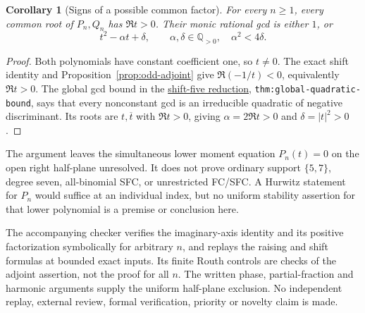 \documentclass[11pt]{article}
\newtheorem{corollary}[lemma]{Corollary}
\begin{document}
\begin{corollary}[Signs of a possible common factor]\label{cor:factor-sign}
For every $n\ge1$, every common root of $P_n,Q_n$ has
$\Re t>0$. Their monic rational gcd is either $1$, or
\[
 t^2-\alpha t+\delta,\qquad
 \alpha,\delta\in\mathbb Q_{>0},\quad \alpha^2<4\delta.
\]
\end{corollary}
\begin{proof}
Both polynomials have constant coefficient one, so $t\ne0$.
The exact shift identity and Proposition~\ref{prop:odd-adjoint}
give $\Re(-1/t)<0$, equivalently $\Re t>0$.
The global gcd bound in the
\href{LOWER_FIVE_QUADRATIC_RESIDUE_REDUCTION.tex}{shift-five reduction},
\texttt{thm:global-quadratic-bound}, says that every nonconstant
gcd is an irreducible quadratic of negative discriminant.
Its roots are $t,\overline t$ with $\Re t>0$, giving
$\alpha=2\Re t>0$ and $\delta=|t|^2>0$.
\end{proof}
The argument leaves the simultaneous lower moment equation
$P_n(t)=0$ on the open right half-plane unresolved.
It does not prove ordinary support $\{5,7\}$, degree seven,
all-binomial SFC, or unrestricted FC/SFC.
A Hurwitz statement for $P_n$ would suffice at an individual index,
but no uniform stability assertion for that lower polynomial is
a premise or conclusion here.

The accompanying checker verifies the imaginary-axis identity and its
positive factorization symbolically for arbitrary $n$, and replays the
raising and shift formulas at bounded exact inputs. Its finite Routh
controls are checks of the adjoint assertion, not the proof for all $n$.
The written phase, partial-fraction and harmonic arguments supply
the uniform half-plane exclusion. No independent replay, external review,
formal verification, priority or novelty claim is made.
\end{document}
